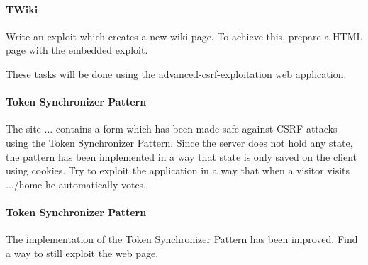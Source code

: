 \documentclass{./handout}
\begin{document}
\begin{subtask}
\paragraph{TWiki}
Write an exploit which creates a new wiki page. To achieve this, prepare 
a HTML page with the embedded exploit. 
\end{subtask}


These tasks will be done using the advanced-csrf-exploitation web application.

\begin{subtask}
\paragraph{Token Synchronizer Pattern}
The site ... contains a form which has been made safe against CSRF attacks
using the Token Synchronizer Pattern.
Since the server does not hold any state, the pattern has been implemented
in a way that state is only saved on the client using cookies. 
Try to exploit the application in a way that when a visitor visits .../home
he automatically votes.

%
\end{subtask}

\begin{subtask}
\paragraph{Token Synchronizer Pattern}
The implementation of the Token Synchronizer Pattern has been improved.
Find a way to still exploit the web page.

\begin{comment}
``Usually, the tokens should be some function (with a secret key - known only
to the server; e.g., MAC) of the cookie! not the cookie.

Than the flow is as follows: 1. Client sends the server request with a
cookie. 2. Server returns a web page with CSRF token(s) for different
purposes (e.g., forms or just a simple get requests via the URL). 3. The
client performs some action (via POST or GET) and sends request with the
token (in the request body or in the URL) and with the cookie. 4. The
server is stateless, but it can verify that the request was sent by the
same client by calculating the function (with the secret key that the
server knows) on the cookie (or on part of it), and comparing the output
with the token.

In the case of CSRF, the cookie is automatically appended to the request by
the browser, but the attacker (that probably even doesn't know the cookie)
cannot add the corresponding tokens.''
\end{comment}

\end{subtask}
\end{document}
